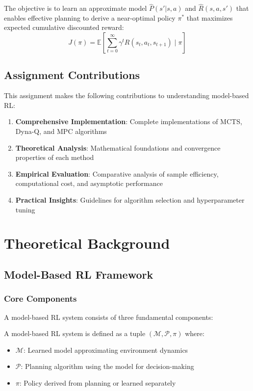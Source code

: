 \documentclass[12pt]{article}
\numberwithin{equation}{section}
\numberwithin{figure}{section}
\numberwithin{table}{section}
\numberwithin{algorithm}{section}
\begin{document}
{{{The objective is to learn an approximate model $\hat{P}(s'|s,a)$ and $\hat{R}(s,a,s')$ that enables effective planning to derive a near-optimal policy $\pi^*$ that maximizes expected cumulative discounted reward:
\begin{equation}
J(\pi) = \mathbb{E}\left[\sum_{t=0}^{\infty} \gamma^t R(s_t, a_t, s_{t+1}) \mid \pi\right]
\end{equation}

\subsection{Assignment Contributions}
This assignment makes the following contributions to understanding model-based RL:

\begin{enumerate}
    \item \textbf{Comprehensive Implementation}: Complete implementations of MCTS, Dyna-Q, and MPC algorithms
    \item \textbf{Theoretical Analysis}: Mathematical foundations and convergence properties of each method
    \item \textbf{Empirical Evaluation}: Comparative analysis of sample efficiency, computational cost, and asymptotic performance
    \item \textbf{Practical Insights}: Guidelines for algorithm selection and hyperparameter tuning
\end{enumerate}

\section{Theoretical Background}

\subsection{Model-Based RL Framework}

\subsubsection{Core Components}
A model-based RL system consists of three fundamental components:

\begin{definition}
A model-based RL system is defined as a tuple $(\mathcal{M}, \mathcal{P}, \pi)$ where:
\begin{itemize}
    \item $\mathcal{M}$: Learned model approximating environment dynamics
    \item $\mathcal{P}$: Planning algorithm using the model for decision-making
    \item $\pi$: Policy derived from planning or learned separately
\end{itemize}
\end{definition}

}}}
\end{document}
